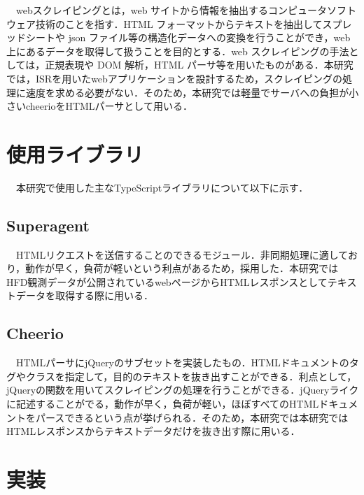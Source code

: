 　webスクレイピングとは，web サイトから情報を抽出するコンピュータソフトウェア技術のことを指す．HTML フォーマットからテキストを抽出してスプレッドシートや json ファイル等の構造化データへの変換を行うことができ，web 上にあるデータを取得して扱うことを目的とする．web スクレイピングの手法としては，正規表現や DOM 解析，HTML パーサ等を用いたものがある．本研究では，ISRを用いたwebアプリケーションを設計するため，スクレイピングの処理に速度を求める必要がない．そのため，本研究では軽量でサーバへの負担が小さいcheerioをHTMLパーサとして用いる．
\section{使用ライブラリ}
　本研究で使用した主なTypeScriptライブラリについて以下に示す．
\subsection{Superagent}

　HTMLリクエストを送信することのできるモジュール．非同期処理に適しており，動作が早く，負荷が軽いという利点があるため，採用した．本研究ではHFD観測データが公開されているwebページからHTMLレスポンスとしてテキストデータを取得する際に用いる．\cite{superagent}
\subsection{Cheerio}

　HTMLパーサにjQueryのサブセットを実装したもの．HTMLドキュメントのタグやクラスを指定して，目的のテキストを抜き出すことができる．利点として，jQueryの関数を用いてスクレイピングの処理を行うことができる．jQueryライクに記述することがでる，動作が早く，負荷が軽い，ほぼすべてのHTMLドキュメントをパースできるという点が挙げられる．そのため，本研究では本研究ではHTMLレスポンスからテキストデータだけを抜き出す際に用いる．\cite{cheerio}
\section{実装}
